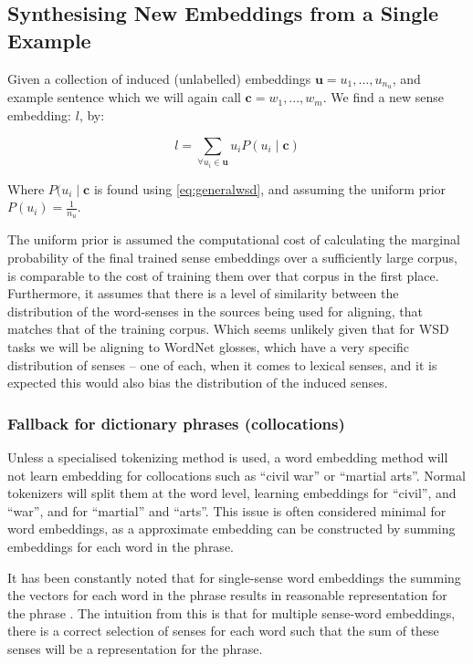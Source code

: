 \documentclass{sig-alternate}
\renewcommand{\c}{\mathbf{c}}
\renewcommand{\u}{\mathbf{u}}
\begin{document}
\subsection{Synthesising New Embeddings from a Single Example}

Given a collection of induced (unlabelled) embeddings $\u={u_1,...,u_{n_u}}$, and example sentence which we will again call $\c={w_1,...,w_m}$. We find a new sense embedding: $l$, by: 

\begin{equation} \label{eq:synth}
l=\sum_{\forall u_i \in \u} u_iP(u_i \mid \c)
\end{equation}

Where $P(u_i \mid \c$ is found using \cref{eq:generalwsd}, and assuming the uniform prior $P(u_i)=\frac{1}{n_u}$.

The uniform prior is assumed the computational cost of calculating the marginal probability of the final trained sense embeddings over a sufficiently large corpus, is comparable to the cost of training them over that corpus in the first place. Furthermore, it assumes that there is a level of similarity between the distribution of the word-senses in the sources being used for aligning, that matches that of the training corpus. Which seems unlikely given that for WSD tasks we will be aligning to WordNet glosses, which have a very specific distribution of senses -- one of each, when it comes to lexical senses, and it is expected this would also bias the distribution of the induced senses.

\subsubsection {Fallback for dictionary phrases (collocations)}
Unless a specialised tokenizing method is used, a word embedding method will not learn embedding for collocations such as ``civil war'' or ``martial arts''. Normal tokenizers will split them at the word level, learning embeddings for ``civil'', and ``war'', and for ``martial'' and ``arts''. This issue is often considered minimal for word embeddings, as a approximate embedding can be constructed by summing embeddings for each word  in the phrase.

It has been constantly noted that for single-sense word embeddings the summing the vectors for each word in the phrase results in reasonable representation for the phrase  \parencite{mikolovSkip} . The intuition from this is that for multiple sense-word embeddings, there is a correct selection of senses for each word such that the sum of these senses will be a representation for the phrase.
\end{document}
